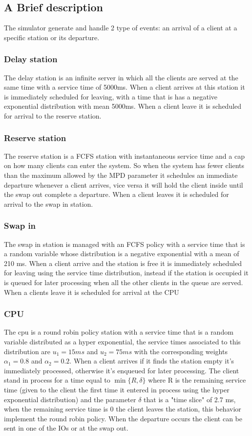 \documentclass[12pt,a4paper]{article}
\begin{document}
\subsection{A Brief description}
The simulator generate and handle 2 type of events: an arrival of a client at a specific station or its departure.
\subsubsection{Delay station}
The delay station is an infinite server in which all the clients are served at the same time with a service time of 5000ms. When a client arrives at this station it is immediately scheduled for leaving, with a time that is has a negative exponential distribution with mean 5000ms. When a client leave it is scheduled for arrival to the reserve station.
\\
\subsubsection{Reserve station}
The reserve station is a FCFS station with instantaneous service time and a cap on how many clients can enter the system. So when the system has fewer clients than the maximum allowed by the MPD parameter it schedules an immediate departure whenever a client arrives, vice versa it will hold the client inside until the swap out complete a departure. When a client leaves it is scheduled for arrival to the swap in station.

\subsubsection{Swap in}
The swap in station is managed with an FCFS policy with a service time that is a random variable whose distribution is a negative exponential with a mean of 210 ms. When a client arrive and the station is free it is immediately scheduled for leaving using the service time distribution, instead if the station is occupied it is queued for later processing when all the other clients in the queue are served. When a clients leave it is scheduled for arrival at the CPU

\subsubsection{CPU}

The cpu is a round robin policy station with a service time that is a random variable distributed as a hyper exponential, the service times associated to this distribution are $u_1=15ms$ and $u_2=75ms$ with the corresponding weights $\alpha_1=0.8$ and $\alpha_2=0.2$. When a client arrives if it finds the station empty it's immediately processed, otherwise it's enqueued for later processing. The client stand in process for a time equal to $\min\{R,\delta\}$ where R is the remaining service time (given to the client the first time it entered in process using the hyper exponential distribution) and the parameter $\delta$ that is a "time slice" of 2.7 ms, when the remaining service time is 0 the client leaves the station, this behavior implement the round robin policy. When the departure occurs the client can be sent in one of the IOs or at the swap out. 
\end{document}
